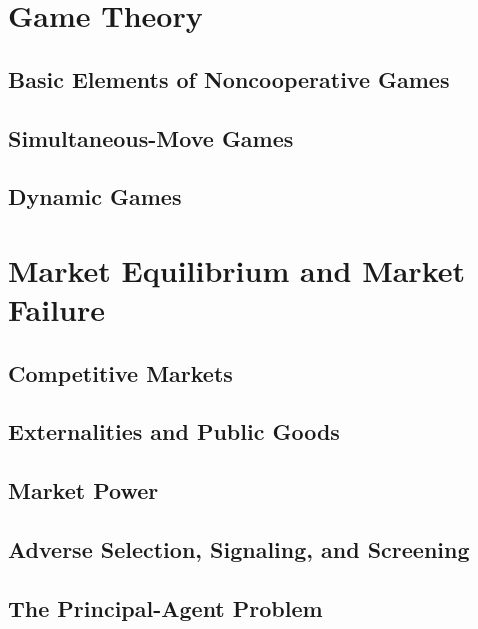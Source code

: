 \documentclass{report} %
\theoremstyle{definition}
\begin{document}
\part{Game Theory}

\chapter{Basic Elements of Noncooperative Games}


\chapter{Simultaneous-Move Games}


\chapter{Dynamic Games}



\part{Market Equilibrium and Market Failure}

\chapter{Competitive Markets}


\chapter{Externalities and Public Goods}


\chapter{Market Power}


\chapter{Adverse Selection, Signaling, and Screening}


\chapter{The Principal-Agent Problem}

\end{document}
